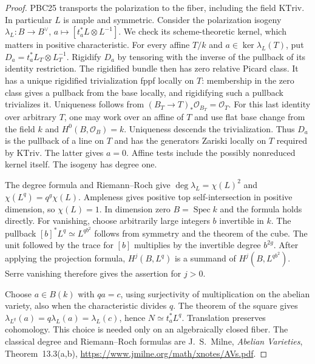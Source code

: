 \begin{proof}
PBC25 transports the polarization to the fiber, including the field
$\mathrm{KTriv}$. In particular $L$ is ample and symmetric.
Consider the polarization isogeny
$\lambda_L:B\to B^\vee$, $a\mapsto[t_a^*L\otimes L^{-1}]$.
We check its scheme-theoretic kernel, which matters in positive
characteristic. For every affine $T/k$ and $a\in\ker\lambda_L(T)$,
put $D_a=t_a^*L_T\otimes L_T^{-1}$. Rigidify $D_a$ by tensoring
with the inverse of the pullback of its identity restriction.
The rigidified bundle then has zero relative Picard class. It has a
unique rigidified trivialization fppf locally on $T$: membership
in the zero class gives a pullback from the base locally, and
rigidifying such a pullback trivializes it. Uniqueness follows
from $(B_T\to T)_*\mathcal O_{B_T}=\mathcal O_T$. For this last
identity over arbitrary $T$, one may work over an affine of $T$
and use flat base change from the field $k$ and
$H^0(B,\mathcal O_B)=k$. Uniqueness descends the trivialization.
Thus $D_a$ is the pullback of a line on $T$ and has the generators
Zariski locally on $T$ required by $\mathrm{KTriv}$. The latter
gives $a=0$. Affine tests include the possibly nonreduced kernel
itself. The isogeny has degree one.

The degree formula and Riemann--Roch give
$\deg\lambda_L=\chi(L)^2$ and $\chi(L^q)=q^g\chi(L)$.
Ampleness gives positive top self-intersection in positive dimension,
so $\chi(L)=1$. In dimension zero $B=\operatorname{Spec} k$
and the formula holds directly. For vanishing, choose arbitrarily
large integers $b$ invertible in $k$. The pullback
$[b]^*L^q\simeq L^{qb^2}$ follows from symmetry and the theorem of
the cube. The unit followed by the trace for $[b]$ multiplies by
the invertible degree $b^{2g}$. After applying the projection formula,
$H^j(B,L^q)$ is a summand of $H^j(B,L^{qb^2})$. Serre vanishing
therefore gives the assertion for $j>0$.

Choose $a\in B(k)$ with $qa=c$, using surjectivity of multiplication
on the abelian variety, also when the characteristic divides $q$.
The theorem of the square gives
$\lambda_{L^q}(a)=q\lambda_L(a)=\lambda_L(c)$, hence
$N\simeq t_a^*L^q$. Translation preserves cohomology. This choice
is needed only on an algebraically closed fiber.
The classical degree and Riemann--Roch formulas are
J.~S.~Milne, \emph{Abelian Varieties}, Theorem~13.3(a,b),
\url{https://www.jmilne.org/math/xnotes/AVs.pdf}.
\end{proof}

